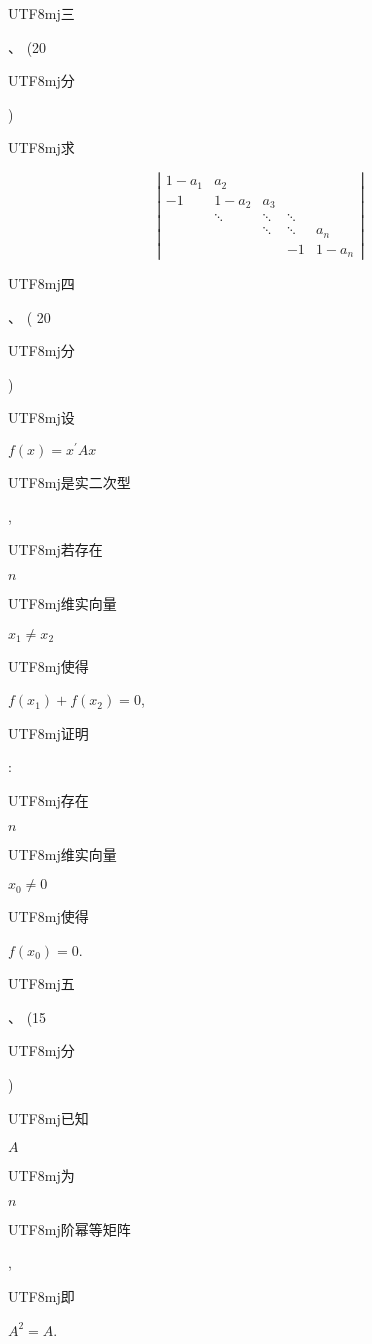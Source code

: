\documentclass[10pt]{article}
\begin{document}
\begin{CJK}{UTF8}{mj}三\end{CJK}、 (20 \begin{CJK}{UTF8}{mj}分\end{CJK}) \begin{CJK}{UTF8}{mj}求\end{CJK}
$$
\left|\begin{array}{ccccc}
1-a_{1} & a_{2} & & & \\
-1 & 1-a_{2} & a_{3} & & \\
& \ddots & \ddots & \ddots & \\
& & \ddots & \ddots & a_{n} \\
& & & -1 & 1-a_{n}
\end{array}\right|
$$
\begin{CJK}{UTF8}{mj}四\end{CJK}、 ( 20 \begin{CJK}{UTF8}{mj}分\end{CJK}) \begin{CJK}{UTF8}{mj}设\end{CJK} $f(x)=x^{\prime} A x$ \begin{CJK}{UTF8}{mj}是实二次型\end{CJK}, \begin{CJK}{UTF8}{mj}若存在\end{CJK} $n$ \begin{CJK}{UTF8}{mj}维实向量\end{CJK} $x_{1} \neq x_{2}$ \begin{CJK}{UTF8}{mj}使得\end{CJK} $f\left(x_{1}\right)+f\left(x_{2}\right)=0$, \begin{CJK}{UTF8}{mj}证明\end{CJK}: \begin{CJK}{UTF8}{mj}存在\end{CJK} $n$ \begin{CJK}{UTF8}{mj}维实向量\end{CJK} $x_{0} \neq 0$ \begin{CJK}{UTF8}{mj}使得\end{CJK} $f\left(x_{0}\right)=0$.

\begin{CJK}{UTF8}{mj}五\end{CJK}、 (15 \begin{CJK}{UTF8}{mj}分\end{CJK}) \begin{CJK}{UTF8}{mj}已知\end{CJK} $A$ \begin{CJK}{UTF8}{mj}为\end{CJK} $n$ \begin{CJK}{UTF8}{mj}阶幂等矩阵\end{CJK}, \begin{CJK}{UTF8}{mj}即\end{CJK} $A^{2}=A$.
\end{document}
